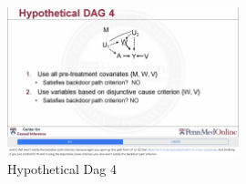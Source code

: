 \begin{figure}[htbp]
	\setlength{\abovecaptionskip}{0pt}     %
	\setlength{\belowcaptionskip}{10pt}
	\vspace{-0cm}  %
	\setlength{\abovecaptionskip}{-0cm}   %
	\setlength{\belowcaptionskip}{-0cm}   %
	\centering
	\includegraphics[width=0.6\textwidth]{figure/dccdag4.jpg}
	\caption{Hypothetical Dag 4}
	\label{dccdag4}
\end{figure}	
















